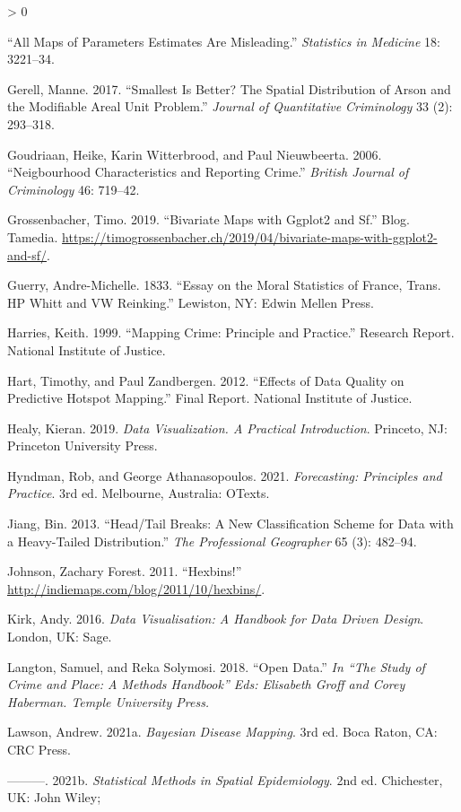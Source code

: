 \documentclass[
]{book}
\newlength{\cslhangindent}
\newenvironment{CSLReferences}[2] %
 {%
  \setlength{\parindent}{0pt}
  \ifodd #1 \everypar{\setlength{\hangindent}{\cslhangindent}}\ignorespaces\fi
  \ifnum #2 > 0
  \setlength{\parskip}{#2\baselineskip}
  \fi
 }%
 {}
\begin{document}
\begin{CSLReferences}{1}{0}
{``All Maps of Parameters Estimates Are Misleading.''} \emph{Statistics in Medicine} 18: 3221--34.

\leavevmode\hypertarget{ref-Gerell_2017}{}%
Gerell, Manne. 2017. {``Smallest Is Better? The Spatial Distribution of Arson and the Modifiable Areal Unit Problem.''} \emph{Journal of Quantitative Criminology} 33 (2): 293--318.

\leavevmode\hypertarget{ref-Goudriaan_2006}{}%
Goudriaan, Heike, Karin Witterbrood, and Paul Nieuwbeerta. 2006. {``Neigbourhood Characteristics and Reporting Crime.''} \emph{British Journal of Criminology} 46: 719--42.

\leavevmode\hypertarget{ref-Grossenbacher_2019}{}%
Grossenbacher, Timo. 2019. {``Bivariate Maps with Ggplot2 and Sf.''} Blog. Tamedia. \url{https://timogrossenbacher.ch/2019/04/bivariate-maps-with-ggplot2-and-sf/}.

\leavevmode\hypertarget{ref-Guerry_1833}{}%
Guerry, Andre-Michelle. 1833. {``Essay on the Moral Statistics of France, Trans. HP Whitt and VW Reinking.''} Lewiston, NY: Edwin Mellen Press.

\leavevmode\hypertarget{ref-Harries_1999}{}%
Harries, Keith. 1999. {``Mapping Crime: Principle and Practice.''} Research Report. National Institute of Justice.

\leavevmode\hypertarget{ref-Hart_2012}{}%
Hart, Timothy, and Paul Zandbergen. 2012. {``Effects of Data Quality on Predictive Hotspot Mapping.''} Final Report. National Institute of Justice.

\leavevmode\hypertarget{ref-Healy_2019}{}%
Healy, Kieran. 2019. \emph{Data Visualization. A Practical Introduction}. Princeto, NJ: Princeton University Press.

\leavevmode\hypertarget{ref-Hyndman_2021}{}%
Hyndman, Rob, and George Athanasopoulos. 2021. \emph{Forecasting: Principles and Practice}. 3rd ed. Melbourne, Australia: OTexts.

\leavevmode\hypertarget{ref-Jiang_2013}{}%
Jiang, Bin. 2013. {``Head/Tail Breaks: A New Classification Scheme for Data with a Heavy-Tailed Distribution.''} \emph{The Professional Geographer} 65 (3): 482--94.

\leavevmode\hypertarget{ref-Johnson_2011}{}%
Johnson, Zachary Forest. 2011. {``Hexbins!''} \url{http://indiemaps.com/blog/2011/10/hexbins/}.

\leavevmode\hypertarget{ref-Kirk_2016}{}%
Kirk, Andy. 2016. \emph{Data Visualisation: A Handbook for Data Driven Design}. London, UK: Sage.

\leavevmode\hypertarget{ref-Langton_2018}{}%
Langton, Samuel, and Reka Solymosi. 2018. {``Open Data.''} \emph{In {``The Study of Crime and Place: A Methods Handbook''} Eds: Elisabeth Groff and Corey Haberman. Temple University Press.}

\leavevmode\hypertarget{ref-Lawson_2021a}{}%
Lawson, Andrew. 2021a. \emph{Bayesian Disease Mapping}. 3rd ed. Boca Raton, CA: CRC Press.

\leavevmode\hypertarget{ref-Lawson_2006}{}%
---------. 2021b. \emph{Statistical Methods in Spatial Epidemiology}. 2nd ed. Chichester, UK: John Wiley; 
\end{CSLReferences}
\end{document}
